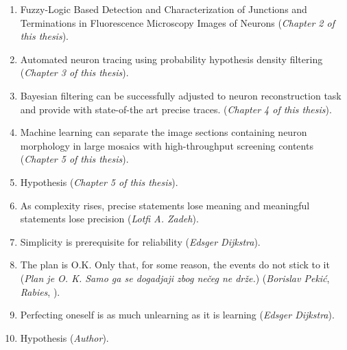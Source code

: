 \documentclass[10pt, twoside]{report}
\begin{document}
\begin{enumerate}
  
\item Fuzzy-Logic Based Detection and Characterization of Junctions and Terminations in Fluorescence Microscopy Images of Neurons (\emph{Chapter 2 of this thesis}). 
  
\medskip
  
\item Automated neuron tracing using probability hypothesis density filtering
	(\emph{Chapter 3 of this thesis}).  
  
\medskip
\item Bayesian filtering can be successfully adjusted to neuron reconstruction task and provide with state-of-the art precise traces. 
	(\emph{Chapter 4 of this thesis}). 

\medskip
\item Machine learning can separate the image sections containing neuron morphology in large mosaics with high-throughput screening contents (\emph{Chapter 5 of this thesis}). 

\medskip

\item Hypothesis (\emph{Chapter 5 of this thesis}). 

\medskip 

\item As complexity rises, precise statements lose meaning and meaningful statements lose precision (\emph{Lotfi A. Zadeh}). 

\medskip
  
\item Simplicity is prerequisite for reliability (\emph{Edsger Dijkstra}). 

\medskip

\item The plan is O.K. Only that, for some reason, the events do not stick to it (\emph{Plan je O. K. Samo ga se dogadjaji zbog ne\v{c}eg ne dr\v{z}e.}) (\emph{Borislav Peki\'{c}}, \emph{Rabies}, ).

\medskip

\item Perfecting oneself is as much unlearning as it is learning (\emph{Edsger Dijkstra}).

\medskip

\item Hypothesis (\emph{Author}).
\medskip

\end{enumerate}

\end{document}
